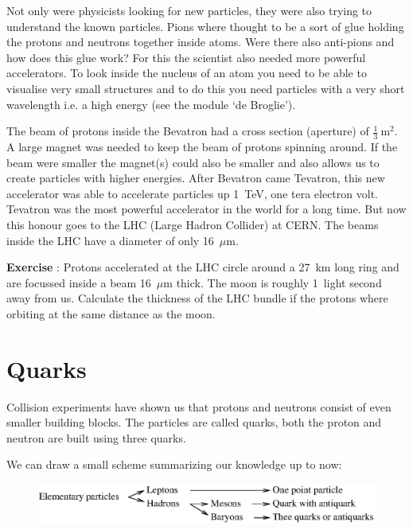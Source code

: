 \documentclass[12pt,a4paper]{article}
\numberwithin{equation}{section}
\numberwithin{figure}{section}
\newcounter{Exercise}
\numberwithin{table}{section}
\begin{document}
Not only were physicists looking for new particles, they were also trying to understand the known particles. Pions where thought to be a sort of glue holding the protons and neutrons together inside atoms. Were there also anti-pions and how does this glue work? For this the scientist also needed more powerful accelerators. To look inside the nucleus of an atom you need to be able to visualise very small structures and to do this you need particles with a very short wavelength i.e. a high energy (see the module `de Broglie').

The beam of protons inside the Bevatron had a cross section (aperture) of $\frac{1}{3}~\mbox{m}^2$. A large magnet was needed to keep the beam of protons spinning around. If the beam were smaller the magnet(s) could also be smaller and also allows us to create particles with higher energies. After Bevatron came Tevatron, this new accelerator was able to accelerate particles up 1~TeV, one tera electron volt. Tevatron was the most powerful accelerator in the world for a long time. But now this honour goes to the LHC (Large Hadron Collider) at CERN. The beams inside the LHC have a diameter of only 16~$\mu$m.

\begin{shaded}
\textbf{Exercise \theExercise {}} : Protons accelerated at the LHC circle around a 27~km long ring and are focussed inside a beam 16~$\mu$m thick. The moon is roughly 1~light second away from us. Calculate the thickness of the LHC bundle if the protons where orbiting at the same distance as the moon.  \end{shaded}

\section{Quarks}
Collision experiments have shown us that protons and neutrons consist of even smaller building blocks. The particles are called quarks, both the proton and neutron are built using three quarks.

We can draw a small scheme summarizing our knowledge up to now:
\begin{figure}[h]\begin{center}
\includegraphics[scale=1]{particles.eps}
\label{fig:particles}
\end{center}\end{figure}
\end{document}
